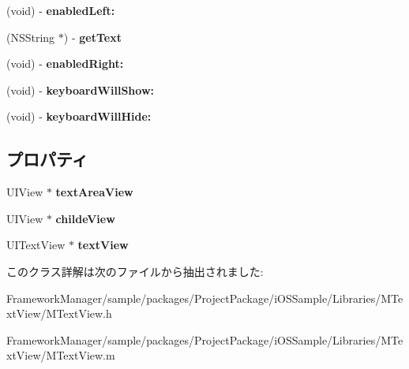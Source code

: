 \begin{DoxyCompactItemize}
\item 
\hypertarget{interface_m_text_view_afcbf7edbcd8c74c86d19b3370567b740}{}(void) -\/ {\bfseries enabled\+Left\+:}\label{interface_m_text_view_afcbf7edbcd8c74c86d19b3370567b740}

\item 
\hypertarget{interface_m_text_view_acd167b100518146cccba8240d3e7b84f}{}(N\+S\+String $\ast$) -\/ {\bfseries get\+Text}\label{interface_m_text_view_acd167b100518146cccba8240d3e7b84f}

\item 
\hypertarget{interface_m_text_view_a5876e09a46aa908761359bccf0c49d46}{}(void) -\/ {\bfseries enabled\+Right\+:}\label{interface_m_text_view_a5876e09a46aa908761359bccf0c49d46}

\item 
\hypertarget{interface_m_text_view_ab182bf70fae40ce5579e00c5664cf28d}{}(void) -\/ {\bfseries keyboard\+Will\+Show\+:}\label{interface_m_text_view_ab182bf70fae40ce5579e00c5664cf28d}

\item 
\hypertarget{interface_m_text_view_a98eb0fc9d08cba8a37bb290846279493}{}(void) -\/ {\bfseries keyboard\+Will\+Hide\+:}\label{interface_m_text_view_a98eb0fc9d08cba8a37bb290846279493}

\end{DoxyCompactItemize}
\subsection*{プロパティ}
\begin{DoxyCompactItemize}
\item 
\hypertarget{interface_m_text_view_ae0713f1ab99c359a35ef97018d89eca0}{}U\+I\+View $\ast$ {\bfseries text\+Area\+View}\label{interface_m_text_view_ae0713f1ab99c359a35ef97018d89eca0}

\item 
\hypertarget{interface_m_text_view_a5bf60859373c61b3bc562190499e796c}{}U\+I\+View $\ast$ {\bfseries childe\+View}\label{interface_m_text_view_a5bf60859373c61b3bc562190499e796c}

\item 
\hypertarget{interface_m_text_view_a867328f2e152a0955d602404715ced59}{}U\+I\+Text\+View $\ast$ {\bfseries text\+View}\label{interface_m_text_view_a867328f2e152a0955d602404715ced59}

\end{DoxyCompactItemize}


このクラス詳解は次のファイルから抽出されました\+:\begin{DoxyCompactItemize}
\item 
Framework\+Manager/sample/packages/\+Project\+Package/i\+O\+S\+Sample/\+Libraries/\+M\+Text\+View/M\+Text\+View.\+h\item 
Framework\+Manager/sample/packages/\+Project\+Package/i\+O\+S\+Sample/\+Libraries/\+M\+Text\+View/M\+Text\+View.\+m\end{DoxyCompactItemize}
